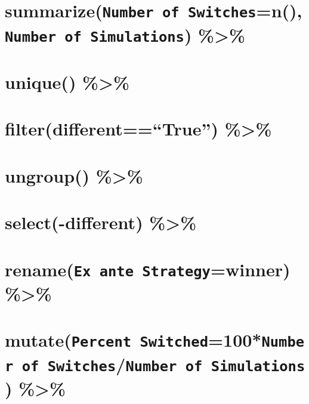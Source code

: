 \documentclass[
]{article}
\begin{document}
\hypertarget{summarizenumber-of-switchesnnumber-of-simulations}{%
\section{\texorpdfstring{summarize(\texttt{Number\ of\ Switches}=n(),\texttt{Number\ of\ Simulations})
\%\textgreater\%}{summarize(Number of Switches=n(),Number of Simulations) \%\textgreater\%}}\label{summarizenumber-of-switchesnnumber-of-simulations}}

\hypertarget{unique}{%
\section{unique() \%\textgreater\%}\label{unique}}

\hypertarget{filterdifferenttrue}{%
\section{filter(different==``True'')
\%\textgreater\%}\label{filterdifferenttrue}}

\hypertarget{ungroup}{%
\section{ungroup() \%\textgreater\%}\label{ungroup}}

\hypertarget{select-different}{%
\section{select(-different) \%\textgreater\%}\label{select-different}}

\hypertarget{renameex-ante-strategywinner}{%
\section{\texorpdfstring{rename(\texttt{Ex\ ante\ Strategy}=winner)
\%\textgreater\%}{rename(Ex ante Strategy=winner) \%\textgreater\%}}\label{renameex-ante-strategywinner}}

\hypertarget{mutatepercent-switched100number-of-switchesnumber-of-simulations}{%
\section{\texorpdfstring{mutate(\texttt{Percent\ Switched}=100*\texttt{Number\ of\ Switches}/\texttt{Number\ of\ Simulations})
\%\textgreater\%}{mutate(Percent Switched=100*Number of Switches/Number of Simulations) \%\textgreater\%}}\label{mutatepercent-switched100number-of-switchesnumber-of-simulations}}
\end{document}
